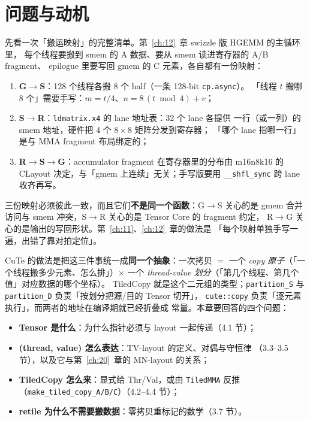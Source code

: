 \section{问题与动机}

先看一次「搬运映射」的完整清单。第~\ref{ch:12}~章 swizzle 版 HGEMM 的主循环里，
每个线程要搬到 smem 的 A 数据、要从 smem 读进寄存器的 A/B fragment、
epilogue 里要写回 gmem 的 C 元素，各自都有一份映射：

\begin{enumerate}
  \item \textbf{G$\to$S}：128 个线程各搬 8 个 half（一条 128-bit \texttt{cp.async}）。
        「线程 $t$ 搬哪 8 个」需要手写：$m = t/4$、$n = 8\,(t \bmod 4) + v$；
  \item \textbf{S$\to$R}：\texttt{ldmatrix.x4} 的 lane 地址表：32 个 lane 各提供
        一行（或一列）的 smem 地址，硬件把 4 个 $8\times8$ 矩阵分发到寄存器；
        「哪个 lane 指哪一行」是与 MMA fragment 布局绑定的；
  \item \textbf{R$\to$S$\to$G}：accumulator fragment 在寄存器里的分布由
        m16n8k16 的 CLayout 决定，与「gmem 上连续」无关；手写版要用
        \texttt{\_\_shfl\_sync} 跨 lane 收齐再写。
\end{enumerate}

三份映射必须彼此一致，而且它们\textbf{不是同一个函数}：G$\to$S 关心的是
gmem 合并访问与 smem 冲突，S$\to$R 关心的是 Tensor Core 的 fragment 约定，
R$\to$G 关心的是输出的写回形状。第~\ref{ch:11}、\ref{ch:12}~章的做法是
「每个映射单独手写一遍，出错了靠对拍定位」。

\begin{sloppypar}
CuTe 的做法是把这三件事统一成\textbf{同一个抽象}：一次拷贝 $=$ 一个
\emph{copy 原子}（「一个线程搬多少元素、怎么排」）$\times$ 一个
\emph{thread-value 划分}（「第几个线程、第几个值」对应数据的哪个坐标）。
TiledCopy 就是这个二元组的类型；\texttt{partition\_S} 与
\texttt{partition\_D} 负责「按划分把源/目的 Tensor 切开」，
\texttt{cute::copy} 负责「逐元素执行」，而两者的地址在编译期就已经折叠成
常量。本章要回答的四个问题：
\end{sloppypar}

\begin{itemize}
  \item \textbf{Tensor 是什么}：为什么指针必须与 layout 一起传递（4.1 节）；
  \item \textbf{(thread, value) 怎么表达}：TV-layout 的定义、对偶与守恒律
        （3.3--3.5 节），以及它与第~\ref{ch:20}~章的 MN-layout 的关系；
  \item \textbf{TiledCopy 怎么来}：显式给 Thr/Val，或由 \texttt{TiledMMA}
        反推（\texttt{make\_\allowbreak{}tiled\_\allowbreak{}copy\_\allowbreak{}A/\allowbreak{}B/\allowbreak{}C}）（4.2--4.4 节）；
  \item \textbf{retile 为什么不需要搬数据}：零拷贝重标记的数学（3.7 节）。
\end{itemize}

